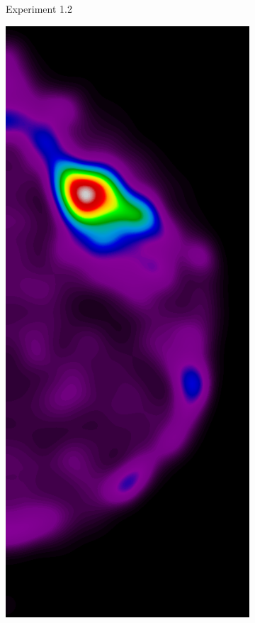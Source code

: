 \begin{figure}[h!]
\begin{subfigure}{0.195\textwidth}
		\caption{Experiment 1.2}
    \end{subfigure}
	\begin{subfigure}{0.195\textwidth}
		\centering
			\includegraphics[width=\textwidth]{plots/examples/example2_probs_1_3.png}

\end{subfigure}
\end{figure}
